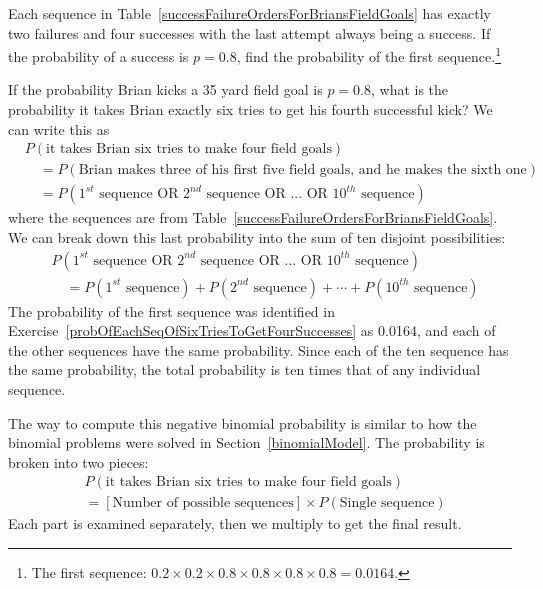 \begin{exercise} \label{probOfEachSeqOfSixTriesToGetFourSuccesses}
Each sequence in Table~\ref{successFailureOrdersForBriansFieldGoals} has exactly two failures and four successes with the last attempt always being a success. If the probability of a success is $p=0.8$, find the probability of the first sequence.\footnote{The first sequence: $0.2\times0.2\times0.8\times0.8\times0.8\times0.8 = 0.0164$.}
\end{exercise}

If the probability Brian kicks a 35 yard field goal is $p=0.8$, what is the probability it takes Brian exactly six tries to get his fourth successful kick? We can write this as
{\small\begin{align*}
&P(\text{it takes Brian six tries to make four field goals}) \\
& \quad = P(\text{Brian makes three of his first five field goals, and he makes the sixth one}) \\
& \quad = P(\text{$1^{st}$ sequence OR $2^{nd}$ sequence OR ... OR $10^{th}$ sequence})
\end{align*}
}where the sequences are from Table~\ref{successFailureOrdersForBriansFieldGoals}. We can break down this last probability into the sum of ten disjoint possibilities:
{\small\begin{align*}
&P(\text{$1^{st}$ sequence OR $2^{nd}$ sequence OR ... OR $10^{th}$ sequence}) \\
&\quad = P(\text{$1^{st}$ sequence}) + P(\text{$2^{nd}$ sequence}) + \cdots + P(\text{$10^{th}$ sequence})
\end{align*}
}The probability of the first sequence was identified in Exercise~\ref{probOfEachSeqOfSixTriesToGetFourSuccesses} as 0.0164, and each of the other sequences have the same probability. Since each of the ten sequence has the same probability, the total probability is ten times that of any individual sequence.

The way to compute this negative binomial probability is similar to how the binomial problems were solved in Section~\ref{binomialModel}. The probability is broken into two pieces:
\begin{align*}
&P(\text{it takes Brian six tries to make four field goals}) \\
&= [\text{Number of possible sequences}] \times P(\text{Single sequence})
\end{align*}
Each part is examined separately, then we multiply to get the final result.

